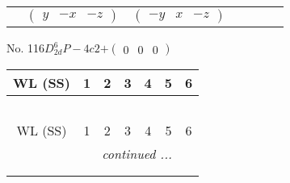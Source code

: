 \documentclass[fleqn,9pt,landscape]{jsarticle}
\begin{document}
\begin{center}
\begin{longtable}{ccccccc}
& $ \begin{pmatrix} y & - x & - z \end{pmatrix} $ & $ \begin{pmatrix} - y & x & - z \end{pmatrix} $ & $  $ & $  $ & $  $ & $  $ \\
\end{longtable}
\end{center}
\newpage
No. 116\quad$D_{2d}^{6}$\quad$P-4c2$\quad[ tetragonal ]\quad$+\begin{pmatrix} 0 & 0 & 0 \end{pmatrix}$
\begin{center}
\renewcommand{\arraystretch}{1.2}
\begin{longtable}{ccccccc}
 \hline \hline
WL (SS) & 1 & 2 & 3 & 4 & 5 & 6 \\ \hline \endfirsthead

\multicolumn{6}{l}{\tablename\ \thetable{}} \\
 \hline \hline
WL (SS) & 1 & 2 & 3 & 4 & 5 & 6 \\ \hline \endhead

 \hline \hline
\multicolumn{6}{r}{\footnotesize\it continued ...} \\ \endfoot

 \hline \hline
\multicolumn{6}{r}{} \\ \endlastfoot


\end{longtable}
\end{center}
\end{document}
